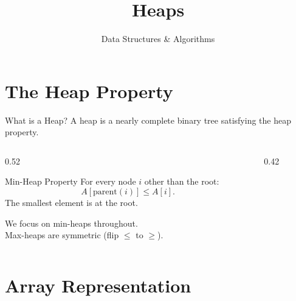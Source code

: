 \documentclass[10pt,aspectratio=169]{beamer}
\title{Heaps}
\subtitle{Data Structures \& Algorithms}
\date{}
\author{}
\begin{document}
\maketitle

\section{The Heap Property}

\begin{frame}{What is a Heap?}
  A \alert{heap} is a nearly complete binary tree satisfying the \alert{heap property}.

  \bigskip
  \begin{columns}[c]
    \begin{column}{0.52\textwidth}
      \begin{block}{Min-Heap Property}
        For every node $i$ other than the root:
        \[
          A[\mathrm{parent}(i)] \le A[i].
        \]
        The \alert{smallest} element is at the root.
      \end{block}

      \bigskip
      We focus on \alert{min-heaps} throughout.\\
      Max-heaps are symmetric (flip $\le$ to $\ge$).
    \end{column}
    \begin{column}{0.42\textwidth}
      \begin{center}
      \end{center}
    \end{column}
  \end{columns}
\end{frame}

\section{Array Representation}
\end{document}
